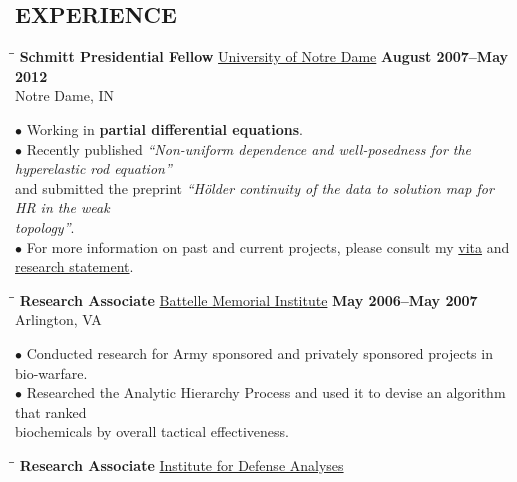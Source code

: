 \documentclass{resume}
\begin{document}
\begin{resume}
		 \section{EXPERIENCE}
	\vspace{-0.1in}	
    \begin{tabbing}
		\hspace{2.3in}\= \hspace{2.6in}\= \kill
        {\bf Schmitt Presidential Fellow} \>\href{http://nd.edu/}{University of Notre Dame}     
	\>\textbf{August 2007--May 2012} \\
		\>Notre Dame, IN 
	\end{tabbing}\vspace{-15pt}    
	$\bullet$ Working in \textbf{partial differential equations}.  
\\
$\bullet$ Recently published \textit{``Non-uniform dependence and well-posedness for the hyperelastic rod
equation''} \\
\phantom{$\bullet$} and submitted the preprint \textit{``H\"older continuity of the data to solution map for HR in the weak \\
\phantom{$\bullet$} topology''}. 
\\
$\bullet$ For more information on past and current projects, please consult
my \href{http://davidkarapetyan.com/pdfs/cv.pdf}{vita} and
\href{http://davidkarapetyan.com/pdfs/research-statement.pdf}{research
statement}. 	
	\begin{tabbing}
		\hspace{2.3in}\= \hspace{2.6in}\= \kill
        {\bf Research Associate} \>\href{http://www.battelle.org/}{Battelle
        Memorial Institute}     
	\>\textbf{May 2006--May 2007} \\
		\>Arlington, VA
	\end{tabbing}\vspace{-15pt}    
	$\bullet$ Conducted research for Army sponsored and privately sponsored projects 
	in bio-warfare. \\ 
      $\bullet$ Researched the Analytic Hierarchy Process 
	and used it to devise an algorithm that ranked \\
	\phantom{$\bullet$} biochemicals by 
	overall tactical effectiveness.
	\begin{tabbing}
		\hspace{2.3in}\= \hspace{2.6in}\= \kill
        {\bf Research Associate } \>\href{https://www.ida.org/}{Institute for
        Defense Analyses} \>  

\end{tabbing}
\end{resume}
\end{document}
